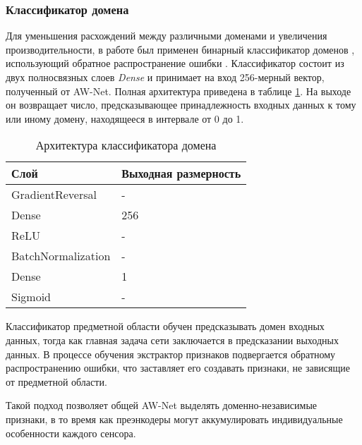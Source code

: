 \subsubsection{Классификатор домена}

Для уменьшения расхождений между различными доменами и увеличения производительности, в работе был применен бинарный классификатор доменов \cite{ganin2016domain}, использующий обратное распространение ошибки \cite{ganin2015unsupervised}. Классификатор состоит из двух полносвязных слоев \textit{Dense} и принимает на вход 256-мерный вектор, полученный от AW-Net. Полная архитектура приведена в таблице \ref{domain-classifyer}. На выходе он возвращает число, предсказывающее принадлежность входных данных к тому или иному домену, находящееся в интервале от 0 до 1.

\begin{table}[H]
    \caption{Архитектура классификатора домена}\label{domain-classifyer}
    \begin{tabular}{|p{5cm}|p{5cm}|}
        \hline
        {Слой} & {Выходная размерность} \\
        \hline
        GradientReversal & - \\
        \hline
        Dense & 256 \\
        \hline
        ReLU & - \\
        \hline
        BatchNormalization & - \\
        \hline
        Dense & 1 \\
        \hline
        Sigmoid & - \\
        \hline
    \end{tabular}
\end{table}

Классификатор предметной области обучен предсказывать домен входных данных, тогда как главная задача сети заключается в предсказании выходных данных. В процессе обучения экстрактор признаков подвергается обратному распространению ошибки, что заставляет его создавать признаки, не зависящие от предметной области.

Такой подход позволяет общей AW-Net выделять доменно-независимые признаки, в то время как преэнкодеры могут аккумулировать индивидуальные особенности каждого сенсора.
